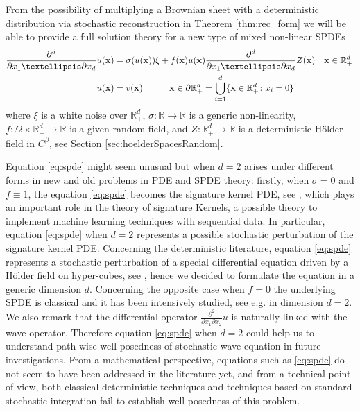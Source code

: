 \documentclass[12pt]{article}
\numberwithin{equation}{section}
\theoremstyle{plain}
\theoremstyle{definition}
\def\gs{\sigma}\def\gS{\Sigma}
\begin{document}
From the possibility of  multiplying a Brownian sheet with a deterministic distribution via stochastic reconstruction in Theorem \ref{thm:rec_form} we will be able to provide a full solution theory  for a new type of mixed non-linear SPDEs
\begin{equation}\label{eq:spde}
\begin{split}
    \frac{\partial^d }{\partial x_1\ldots\partial x_d}u(\fx) &= \gs(u(\fx))\xi+ f(\fx)u(\fx)\frac{\partial^d }{\partial x_1\ldots\partial x_d}Z(\fx)\quad  \fx \in \mathbb R_+^d\,\\
u(\fx)&=v(\fx) \qquad  \quad \fx\in \partial \mathbb R_+^d=\bigcup_{i=1}^d\{\fx\in \mathbb R_+^d \colon x_i=0 \}
\end{split}
\end{equation}
where $\xi$ is a white noise over $ \mathbb R_+^d$, $\sigma\colon \mathbb R\to \mathbb R$ is a generic non-linearity, $f\colon \Omega\times \mathbb R_+^d\to \mathbb R$ is a given random field, and $Z\colon \mathbb R_+^d\to \mathbb R$ is a deterministic H\"older field in $C^{\beta}$, see Section \ref{sec:hoelderSpacesRandom}. 


 
Equation \eqref{eq:spde} might seem unusual but when $d=2$  arises under different forms in new and old problems in PDE and SPDE theory: firstly, when $\sigma=0$ and $f\equiv 1$, the equation \eqref{eq:spde}  becomes the signature kernel PDE, see \cite{kernel_pde}, which   plays an important role in the theory of signature Kernels, a possible theory to implement machine learning techniques with sequential data. In particular, equation  \eqref{eq:spde} when $d=2$ represents a possible  stochastic perturbation  of the  signature kernel PDE. Concerning the deterministic literature, equation \eqref{eq:spde} represents a stochastic perturbation of a special differential  
equation driven by a H\"older field on hyper-cubes, see \cite{harang21}, hence we decided to formulate the equation in a generic dimension $d$. Concerning the opposite case when $f=0$ the underlying SPDE is classical and it has been intensively studied, see e.g. 
\cite{cairoli72,nualart89,nualart89A,millet94} in dimension $d=2$. 
We also remark that the differential operator $\frac{\partial^2 }{\partial x_1\partial x_2}u$ is naturally linked with the wave operator. Therefore  equation  \eqref{eq:spde} when $d=2$ could  help us to understand  path-wise well-posedness of stochastic wave equation in future investigations. From a mathematical perspective, equations such as \eqref{eq:spde} do not seem to have been addressed in the literature yet, and from a technical point of view, both classical deterministic techniques and techniques based on standard stochastic integration fail to establish well-posedness of this problem.
\end{document}

